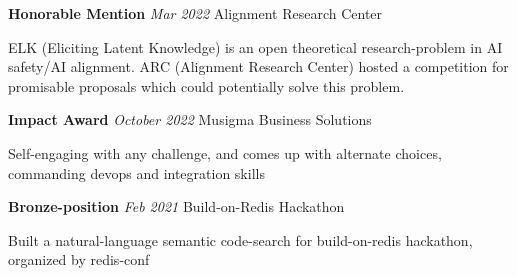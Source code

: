 \documentclass[fontsize=11pt]{article}
\newcommand{\sepspace}{\vspace*{1em}}   %
\newcommand{\EducationEntry}[4]{
    \noindent \textbf{#1} \hfill      %
    \colorbox{Black}{
      \parbox{8.5em}{
      \hfill\color{White}#2}} \par  %
    \noindent \textit{#3} \par        %
    \noindent\hangindent=2em\hangafter=0 \small #4 %
    \normalsize \par}
\newcommand{\AwardEntry}[4]{         %
    \noindent \textbf{#1} \noindent \textit{#3} \hfill {#2} \par
    \noindent \small #4 %
    \normalsize \par}
\begin{document}
\AwardEntry{Honorable Mention}{Alignment Research Center}
{Mar 2022}
{ELK (Eliciting Latent Knowledge) is an open theoretical research-problem in AI safety/AI alignment. ARC (Alignment Research Center) hosted a competition for promisable proposals which could potentially solve this problem.}
\sepspace
\AwardEntry{Impact Award}{Musigma Business Solutions}
{October 2022}
{Self-engaging with any challenge, and comes up with alternate choices, commanding devops and integration skills}
\sepspace
\AwardEntry{Bronze-position}{Build-on-Redis Hackathon}
{Feb 2021}
{Built a natural-language semantic code-search for build-on-redis hackathon, organized by redis-conf}
\ 
\end{document}
